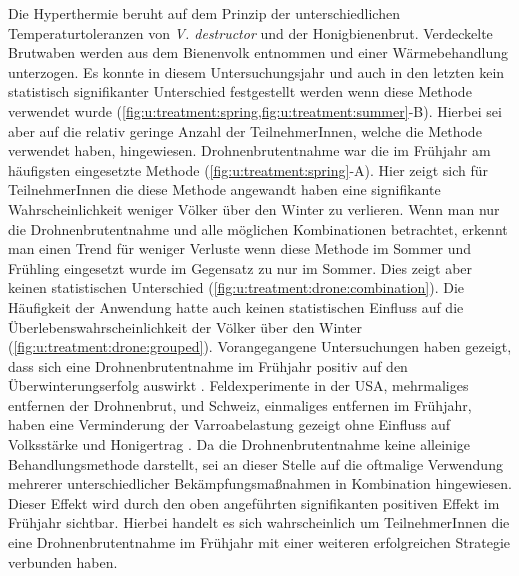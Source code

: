 Die Hyperthermie beruht auf dem Prinzip der unterschiedlichen Temperaturtoleranzen von \textit{V. destructor} und der Honigbienenbrut. Verdeckelte Brutwaben werden aus dem Bienenvolk entnommen und einer Wärmebehandlung unterzogen. Es konnte in diesem Untersuchungsjahr und auch in den letzten kein statistisch signifikanter Unterschied festgestellt werden wenn diese Methode verwendet wurde \citep{crailsheim2018, oberreiter2020} (\cref{fig:u:treatment:spring,fig:u:treatment:summer}-B). Hierbei sei aber auf die relativ geringe Anzahl der TeilnehmerInnen, welche die Methode verwendet haben, hingewiesen.
\newline
Drohnenbrutentnahme war die im Frühjahr am häufigsten eingesetzte Methode (\cref{fig:u:treatment:spring}-A). Hier zeigt sich für TeilnehmerInnen die diese Methode angewandt haben eine signifikante Wahrscheinlichkeit weniger Völker über den Winter zu verlieren. Wenn man nur die Drohnenbrutentnahme und alle möglichen Kombinationen betrachtet, erkennt man einen Trend für weniger Verluste wenn diese Methode im Sommer und Frühling eingesetzt wurde im Gegensatz zu nur im Sommer. Dies zeigt aber keinen statistischen Unterschied (\cref{fig:u:treatment:drone:combination}). Die Häufigkeit der Anwendung hatte auch keinen statistischen Einfluss auf die Überlebenswahrscheinlichkeit der Völker über den Winter (\cref{fig:u:treatment:drone:grouped}). Vorangegangene Untersuchungen haben gezeigt, dass sich eine Drohnenbrutentnahme im Frühjahr positiv auf den Überwinterungserfolg auswirkt \citep{brodschneider2013, oberreiter2020, crailsheim2018}. Feldexperimente in der USA, mehrmaliges entfernen der Drohnenbrut, und Schweiz, einmaliges entfernen im Frühjahr, haben eine Verminderung der Varroabelastung gezeigt ohne Einfluss auf Volksstärke und Honigertrag \citep{charriere1998, calderone2005}. Da die Drohnenbrutentnahme keine alleinige Behandlungsmethode darstellt, sei an dieser Stelle auf die oftmalige Verwendung mehrerer unterschiedlicher Bekämpfungsmaßnahmen in Kombination hingewiesen. Dieser Effekt wird durch den oben angeführten signifikanten positiven Effekt im Frühjahr sichtbar. Hierbei handelt es sich wahrscheinlich um TeilnehmerInnen die eine Drohnenbrutentnahme im Frühjahr mit einer weiteren erfolgreichen Strategie verbunden haben. 
\newline
